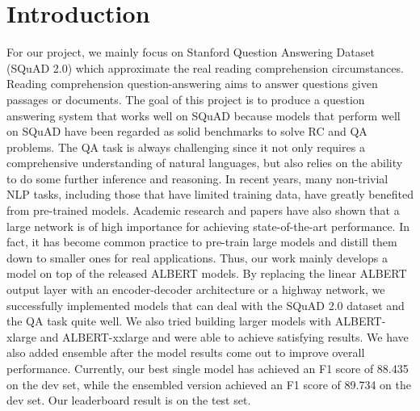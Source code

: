 \documentclass{article}
\begin{document}
\section{Introduction}
For our project, we mainly focus on Stanford Question Answering Dataset (SQuAD 2.0) which approximate the real reading comprehension circumstances. Reading comprehension question-answering aims to answer questions given passages or documents. The goal of this project is to produce a question answering system that works well on SQuAD because models that perform well on SQuAD have been regarded as solid benchmarks to solve RC and QA problems. The QA task is always challenging since it not only requires a comprehensive understanding of natural languages, but also relies on the ability to do some further inference and reasoning. In recent years, many non-trivial NLP tasks, including those that have limited training data, have greatly benefited from pre-trained models. Academic research and papers have also shown that a large network is of high importance for achieving state-of-the-art performance. \citep{bert} \citep{radford} In fact, it has become common practice to pre-train large models and distill them down to smaller ones for real applications. \citep{sun} \citep{turc} Thus, our work mainly develops a model on top of the released ALBERT models. By replacing the linear ALBERT output layer with an encoder-decoder architecture or a highway network, we successfully implemented models that can deal with the SQuAD 2.0 dataset and the QA task quite well. We also tried building larger models with ALBERT-xlarge and ALBERT-xxlarge and were able to achieve satisfying results. We have also added ensemble after the model results come out to improve overall performance. Currently, our best single model has achieved an F1 score of 88.435 on the dev set, while the ensembled version achieved an F1 score of 89.734 on the dev set. Our leaderboard result is  on the test set.
\end{document}
